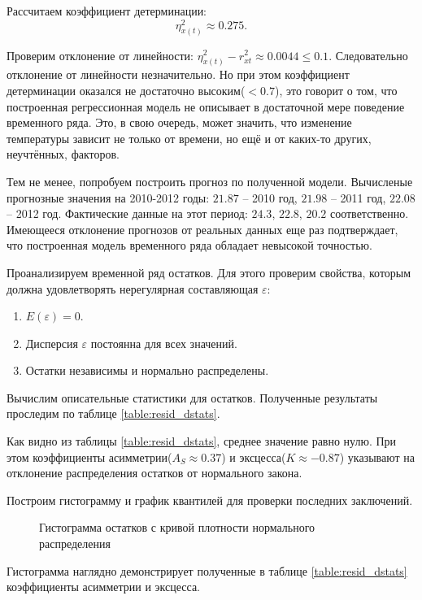 Рассчитаем коэффициент детерминации:
\begin{equation*}
	\eta_{x(t)}^2 \approx 0.275.
\end{equation*}

Проверим отклонение от линейности: $\eta_{x(t)}^2 - r_{xt}^{2} \approx 0.0044 \le 0.1$. Следовательно отклонение от линейности незначительно. Но при этом коэффициент детерминации оказался не достаточно высоким($<0.7$), это говорит о том, что построенная регрессионная модель не описывает в достаточной мере поведение временного ряда. Это, в свою очередь, может значить, что изменение температуры зависит не только от времени, но ещё и от каких-то других, неучтённых, факторов.

Тем не менее, попробуем построить прогноз по полученной модели. Вычисленые прогнозные значения на 2010-2012 годы: $21.87$ – 2010 год, $21.98$ – 2011 год, $22.08$ – 2012 год. Фактические данные на этот период: $24.3$, $22.8$, $20.2$ соответственно. Имеющееся отклонение прогнозов от реальных данных еще раз подтверждает, что построенная модель временного ряда обладает невысокой точностью.

Проанализируем временной ряд остатков. Для этого проверим свойства, которым должна удовлетворять нерегулярная составляющая $\varepsilon$:
\begin{enumerate}
	\item $E(\varepsilon) = 0$.
	\item Дисперсия $\varepsilon$ постоянна для всех значений.
	\item Остатки независимы и нормально распределены.
\end{enumerate}
Вычислим описательные статистики для остатков. Полученные результаты проследим по таблице \ref{table:resid_dstats}.


Как видно из таблицы \ref{table:resid_dstats}, среднее значение равно нулю. При этом коэффициенты асимметрии($A_S \approx 0.37$) и эксцесса($K \approx -0.87$) указывают на отклонение распределения остатков от нормального закона. 

Построим гистограмму и график квантилей для проверки последних заключений.
\begin{figure}[ht]
\caption{Гистограмма остатков с кривой плотности нормального распределения}
\label{img:resid_hist}
\end{figure}
Гистограмма наглядно демонстрирует полученные в таблице \ref{table:resid_dstats} коэффициенты асимметрии и эксцесса. 

